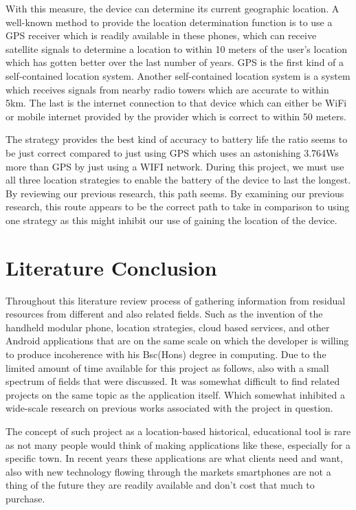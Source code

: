 \par With this measure, the device can determine its current geographic location. A well-known method to provide the location determination function is to use a GPS receiver which is readily available in these phones, which can receive satellite signals to determine a location to within 10 meters of the user's location which has gotten better over the last number of years. GPS is the first kind of a self-contained location system. Another self-contained location system is a system which receives signals from nearby radio towers which are accurate to within 5km. The last is the internet connection to that device which can either be WiFi or mobile internet provided by the provider which is correct to within 50 meters.

\par The strategy provides the best kind of accuracy to battery life the ratio seems to be just correct compared to just using GPS which uses an astonishing 3.764Ws more than GPS by just using a WIFI network. During this project, we must use all three location strategies to enable the battery of the device to last the longest. By reviewing our previous research, this path seems. By examining our previous research, this route appears to be the correct path to take in comparison to using one strategy as this might inhibit our use of gaining the location of the device.\cite{bareth2011energy}

\section{Literature Conclusion}
Throughout this literature review process of gathering information from residual resources from different and also related fields. Such as the invention of the handheld modular phone, location strategies, cloud based services, and other Android applications that are on the same scale on which the developer is willing to produce incoherence with his Bsc(Hons) degree in computing. Due to the limited amount of time available for this project as follows, also with a small spectrum of fields that were discussed. It was somewhat difficult to find related projects on the same topic as the application itself. Which somewhat inhibited a wide-scale research on previous works associated with the project in question.

\par The concept of such project as a location-based historical, educational tool is rare as not many people would think of making applications like these, especially for a specific town. In recent years these applications are what clients need and want, also with new technology flowing through the markets smartphones are not a thing of the future they are readily available and don't cost that much to purchase.

